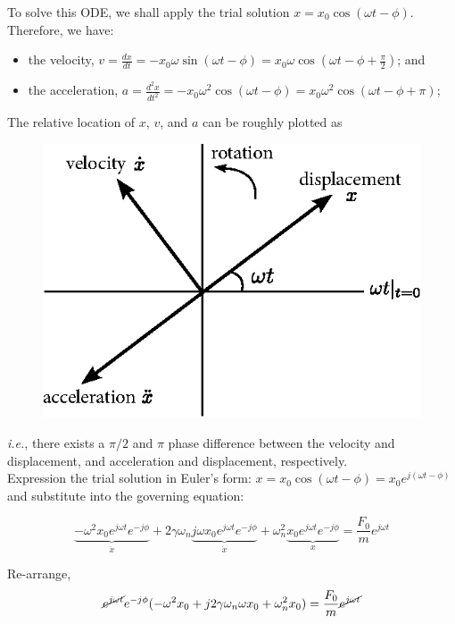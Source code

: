 \documentclass[12pt,a4paper]{article}
\begin{document}
\begin{tcolorbox}[breakable, title=Solution Procedure and Discussions]
To solve this ODE, we shall apply the trial solution $\displaystyle x = x_{0}\cos(\omega t-\phi)$. Therefore, we have:
\begin{itemize}
    \item the velocity, $\displaystyle v = \frac{dx}{dt} = - x_0 \omega \sin(\omega t - \phi) =  x_0 \omega \cos(\omega t - \phi + \frac{\pi}{2})$; and

    \item the acceleration, $\displaystyle a = \frac{d^{2}x}{dt^{2}} = - x_0 \omega^2 \cos(\omega t - \phi) =  x_0 \omega^2 \cos(\omega t - \phi + \pi)$;
\end{itemize}
The relative location of $x$, $v$, and $a$ can be roughly plotted as 
\begin{figure}[H]
    \centering
    \includegraphics[width=.55\textwidth]{x-v-a.eps}
\end{figure}
\textit{i.e.}, there exists a $\pi/2$ and $\pi$ phase difference between the velocity and displacement, and acceleration and displacement, respectively.\\

Expression the trial solution in Euler's form: $\displaystyle x = x_{0}\cos(\omega t-\phi)=x_{0}e^{j(\omega t -\phi)}$ and substitute into the governing equation:

\begin{equation}
    \underbrace{-\omega^{2}x_{0}e^{j\omega t }e^{-j\phi}}_{\ddot{x}}
    + 2\gamma \omega_{n} \underbrace{j\omega x_{0}e^{j\omega t }e^{-j\phi}}_{\dot{x}}
    +\omega_{n}^{2} \underbrace{x_{0}e^{j\omega t }e^{-j\phi}}_{x}
    =\frac{F_{0}}{m}e^{j\omega t}
\end{equation}

Re-arrange,
\begin{equation} \label{eqn:25}
     \cancel{e^{j\omega t}} e^{-j\phi} (-\omega^{2} x_0 + j2\gamma\omega_{n}\omega x_0 + \omega_{n}^{2} x_0) = \frac{F_{0}}{m} \cancel{e^{j\omega t}}
\end{equation}


\end{tcolorbox}
\end{document}
